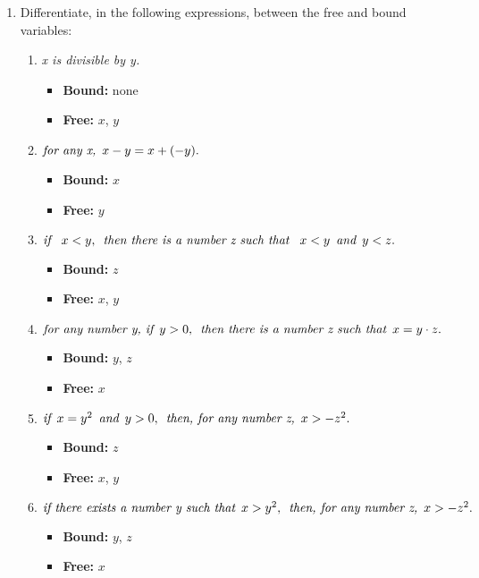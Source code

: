 \begin{enumerate}
\item Differentiate, in the following expressions, between the free
  and bound variables:
  \begin{enumerate}
  \item \emph{x is divisible by y.}
    \begin{itemize}
    \item \textbf{Bound:} none
    \item \textbf{Free:} $x$, $y$
    \end{itemize}
  \item $\emph{for any x,} \enspace x - y = x + (-y).$
    \begin{itemize}
    \item \textbf{Bound:} $x$
    \item \textbf{Free:} $y$
    \end{itemize}
  \item $\emph{if } \enspace x < y, \enspace \emph{then there is a
      number z such that } \enspace x < y \enspace \emph{and} \enspace
    y < z.$
    \begin{itemize}
    \item \textbf{Bound:} $z$
    \item \textbf{Free:} $x$, $y$
    \end{itemize}
  \item $\emph{for any number y, if} \enspace y > 0, \enspace
    \emph{then there is a number z such that} \enspace x = y \cdot z.$
    \begin{itemize}
    \item \textbf{Bound:} $y$, $z$
    \item \textbf{Free:} $x$
    \end{itemize}
  \item $\emph{if} \enspace x = y^2 \enspace \emph{and} \enspace y >
    0, \enspace \emph{then, for any number z,} \enspace x > -z^2.$
    \begin{itemize}
    \item \textbf{Bound:} $z$
    \item \textbf{Free:} $x$, $y$
    \end{itemize}
  \item $\emph{if there exists a number y such that} \enspace x > y^2,
    \enspace \emph{then, for any number z,} \enspace x > -z^2.$
    \begin{itemize}
    \item \textbf{Bound:} $y$, $z$
    \item \textbf{Free:} $x$
    \end{itemize}
  \end{enumerate}


\end{enumerate}
